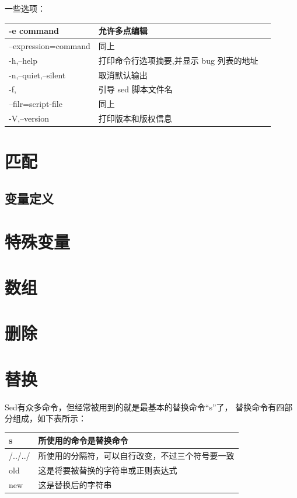 一些选项：

\begin{tabular}{l|lp{20em}}
\hline
-e command             & 允许多点编辑 \\
\hline
--expression=command   & 同上 \\
\hline
-h,--help              & 打印命令行选项摘要,并显示 bug 列表的地址 \\
\hline
-n,--quiet,--silent    & 取消默认输出 \\
\hline
-f,                    & 引导 sed 脚本文件名 \\
\hline
--filr=script-file     & 同上 \\
\hline
-V,--version           & 打印版本和版权信息\\
\hline
\end{tabular}

\section{匹配}
\label{sec:sedPattern}

\subsection{变量定义}
\label{subsec:sedVariableDef}

\section{特殊变量}
\label{sec:sedSpecialVariable}

\section{数组}
\label{sec:sedArray}

\section{删除}
\label{sec:sedDelete}

\section{替换}
 
Sed有众多命令，但经常被用到的就是最基本的替换命令“s”了， 替换命令有四部分组成，如下表所示：

\begin{table}[h]
\centering
\begin{tabular}{l|l}
\hline
s	     & 所使用的命令是替换命令 \\
\hline
/../../	 & 所使用的分隔符，可以自行改变，不过三个符号要一致 \\
\hline
old	     & 这是将要被替换的字符串或正则表达式 \\
\hline
new	     & 这是替换后的字符串 \\
\hline
\end{tabular}
\end{table}

